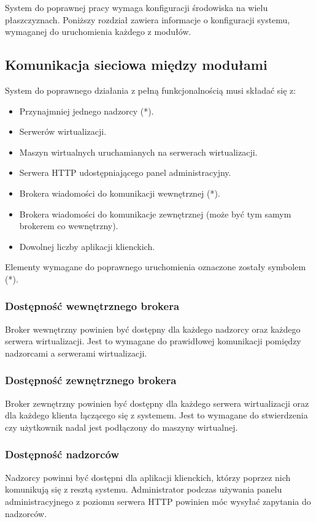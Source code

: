 \documentclass[../opis-rozwiazania.tex]{subfiles}
\begin{document}
\label{system_requirements}

System do poprawnej pracy wymaga konfiguracji środowiska na wielu płaszczyznach. Poniższy rozdział zawiera informacje o konfiguracji systemu, wymaganej do uruchomienia każdego z modułów.

\subsection{Komunikacja sieciowa między modułami}
System do poprawnego działania z pełną funkcjonalnością musi składać się z:
\begin{itemize}
  \item Przynajmniej jednego nadzorcy (*).
  \item Serwerów wirtualizacji.
  \item Maszyn wirtualnych uruchamianych na serwerach wirtualizacji.
  \item Serwera HTTP udostępniającego panel administracyjny.
  \item Brokera wiadomości do komunikacji wewnętrznej (*).
  \item Brokera wiadomości do komunikacje zewnętrznej (może być tym samym brokerem co wewnętrzny).
  \item Dowolnej liczby aplikacji klienckich.
\end{itemize}
Elementy wymagane do poprawnego uruchomienia oznaczone zostały symbolem (*).

\subsubsection{Dostępność wewnętrznego brokera}
Broker wewnętrzny powinien być dostępny dla każdego nadzorcy oraz każdego serwera wirtualizacji.
Jest to wymagane do prawidłowej komunikacji pomiędzy nadzorcami a serwerami wirtualizacji.

\subsubsection{Dostępność zewnętrznego brokera}
Broker zewnętrzny powinien być dostępny dla każdego serwera wirtualizacji oraz dla każdego klienta łączącego się z systemem.
Jest to wymagane do stwierdzenia czy użytkownik nadal jest podłączony do maszyny wirtualnej.

\subsubsection{Dostępność nadzorców}
Nadzorcy powinni być dostępni dla aplikacji klienckich, którzy poprzez nich komunikują się z resztą systemu.
Administrator podczas używania panelu administracyjnego z poziomu serwera HTTP powinien móc wysyłać zapytania do nadzorców.
\end{document}
